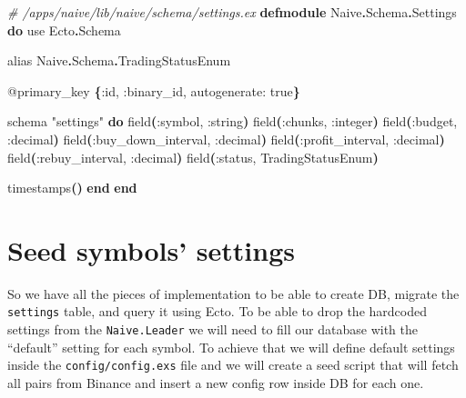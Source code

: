 \documentclass[
  oneside]{book}
\newenvironment{Shaded}{\begin{snugshade}}{\end{snugshade}}
\newcommand{\CommentTok}[1]{\textcolor[rgb]{0.56,0.35,0.01}{\textit{#1}}}
\newcommand{\ConstantTok}[1]{\textcolor[rgb]{0.56,0.35,0.01}{#1}}
\newcommand{\FunctionTok}[1]{\textcolor[rgb]{0.13,0.29,0.53}{\textbf{#1}}}
\newcommand{\ImportTok}[1]{#1}
\newcommand{\KeywordTok}[1]{\textcolor[rgb]{0.13,0.29,0.53}{\textbf{#1}}}
\newcommand{\NormalTok}[1]{#1}
\newcommand{\OperatorTok}[1]{\textcolor[rgb]{0.81,0.36,0.00}{\textbf{#1}}}
\newcommand{\OtherTok}[1]{\textcolor[rgb]{0.56,0.35,0.01}{#1}}
\newcommand{\StringTok}[1]{\textcolor[rgb]{0.31,0.60,0.02}{#1}}
\newcommand{\VariableTok}[1]{\textcolor[rgb]{0.00,0.00,0.00}{#1}}
\begin{document}
\begin{Shaded}
\begin{Highlighting}[]
\CommentTok{\# /apps/naive/lib/naive/schema/settings.ex}
\KeywordTok{defmodule} \ConstantTok{Naive}\OperatorTok{.}\ConstantTok{Schema}\OperatorTok{.}\ConstantTok{Settings} \KeywordTok{do}
  \ImportTok{use} \ConstantTok{Ecto}\OperatorTok{.}\ConstantTok{Schema}

  \ImportTok{alias} \ConstantTok{Naive}\OperatorTok{.}\ConstantTok{Schema}\OperatorTok{.}\ConstantTok{TradingStatusEnum}

  \OtherTok{@primary\_key} \FunctionTok{\{}\VariableTok{:id}\NormalTok{, }\VariableTok{:binary\_id}\NormalTok{, }\VariableTok{autogenerate:} \ConstantTok{true}\FunctionTok{\}}

\NormalTok{  schema }\StringTok{"settings"} \KeywordTok{do}
\NormalTok{    field}\FunctionTok{(}\VariableTok{:symbol}\NormalTok{, }\VariableTok{:string}\FunctionTok{)}
\NormalTok{    field}\FunctionTok{(}\VariableTok{:chunks}\NormalTok{, }\VariableTok{:integer}\FunctionTok{)}
\NormalTok{    field}\FunctionTok{(}\VariableTok{:budget}\NormalTok{, }\VariableTok{:decimal}\FunctionTok{)}
\NormalTok{    field}\FunctionTok{(}\VariableTok{:buy\_down\_interval}\NormalTok{, }\VariableTok{:decimal}\FunctionTok{)}
\NormalTok{    field}\FunctionTok{(}\VariableTok{:profit\_interval}\NormalTok{, }\VariableTok{:decimal}\FunctionTok{)}
\NormalTok{    field}\FunctionTok{(}\VariableTok{:rebuy\_interval}\NormalTok{, }\VariableTok{:decimal}\FunctionTok{)}
\NormalTok{    field}\FunctionTok{(}\VariableTok{:status}\NormalTok{, }\ConstantTok{TradingStatusEnum}\FunctionTok{)}

\NormalTok{    timestamps}\FunctionTok{()}
  \KeywordTok{end}
\KeywordTok{end}
\end{Highlighting}
\end{Shaded}

\section{Seed symbols' settings}\label{seed-symbols-settings}

So we have all the pieces of implementation to be able to create DB, migrate the \texttt{settings} table, and query it using Ecto. To be able to drop the hardcoded settings from the \texttt{Naive.Leader} we will need to fill our database with the ``default'' setting for each symbol. To achieve that we will define default settings inside the \texttt{config/config.exs} file and we will create a seed script that will fetch all pairs from Binance and insert a new config row inside DB for each one.
\end{document}
